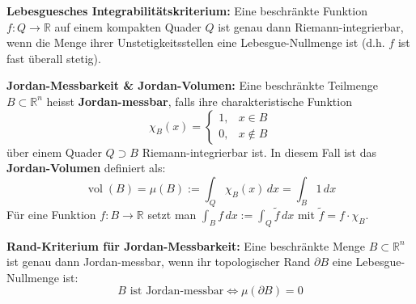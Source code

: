 \begin{theorem}
    \textbf{Lebesguesches Integrabilitätskriterium:}
    Eine beschränkte Funktion $f: Q \to \mathbb{R}$ auf einem kompakten Quader $Q$ ist genau dann Riemann-integrierbar, wenn die Menge ihrer Unstetigkeitsstellen eine Lebesgue-Nullmenge ist (d.h. $f$ ist fast überall stetig).
\end{theorem}

\begin{definition}
    \textbf{Jordan-Messbarkeit \& Jordan-Volumen:}
    Eine beschränkte Teilmenge $B \subset \mathbb{R}^n$ heisst \textbf{Jordan-messbar}, falls ihre charakteristische Funktion
    $$ \chi_B(x) = \begin{cases} 1, & x \in B \\ 0, & x \notin B \end{cases} $$
    über einem Quader $Q \supset B$ Riemann-integrierbar ist. In diesem Fall ist das \textbf{Jordan-Volumen} definiert als:
    $$ \operatorname{vol}(B) = \mu(B) := \int_Q \chi_B(x) \, dx = \int_B 1 \, dx $$
    Für eine Funktion $f: B \to \mathbb{R}$ setzt man $\int_B f \, dx := \int_Q \tilde{f} \, dx$ mit $\tilde{f} = f \cdot \chi_B$.
\end{definition}

\begin{theorem}
    \textbf{Rand-Kriterium für Jordan-Messbarkeit:}
    Eine beschränkte Menge $B \subset \mathbb{R}^n$ ist genau dann Jordan-messbar, wenn ihr topologischer Rand $\partial B$ eine Lebesgue-Nullmenge ist:
    $$ B \text{ ist Jordan-messbar} \iff \mu(\partial B) = 0 $$
\end{theorem}

